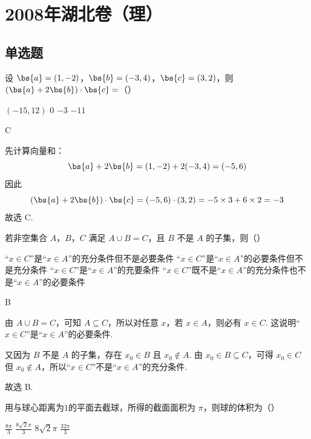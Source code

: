 \chapter{2008年湖北卷（理）}

\section{单选题}

\begin{problem}
设 \(\bs{a}=(1,-2)\)，\(\bs{b}=(-3,4)\)，\(\bs{c}=(3,2)\)，则 \((\bs{a}+2\bs{b})\cdot \bs{c}=\)（\quad）

\choices
    {\((-15,12)\)}
    {\(0\)}
    {\(-3\)}
    {\(-11\)}
\end{problem}

\begin{answer}
C
\end{answer}

\begin{solution}
先计算向量和：
\[
\bs{a}+2\bs{b}=(1,-2)+2(-3,4)=(-5,6)
\]
因此
\[
(\bs{a}+2\bs{b})\cdot\bs{c}=(-5,6)\cdot(3,2)=-5\times3+6\times2=-3
\]
故选 C.
\end{solution}

\begin{problem}
若非空集合 \(A\)，\(B\)，\(C\) 满足 \(A \cup B = C\)，且 \(B\) 不是 \(A\) 的子集，则（\quad）

\choices
    {“\(x \in C\)”是“\(x \in A\)”的充分条件但不是必要条件}
    {“\(x \in C\)”是“\(x \in A\)”的必要条件但不是充分条件}
    {“\(x \in C\)”是“\(x \in A\)”的充要条件}
    {“\(x \in C\)”既不是“\(x \in A\)”的充分条件也不是“\(x \in A\)”的必要条件}
\end{problem}

\begin{answer}
B
\end{answer}

\begin{solution}
由 \(A\cup B=C\)，可知 \(A\subseteq C\)，所以对任意 \(x\)，若 \(x\in A\)，则必有 \(x\in C\). 这说明“\(x\in C\)”是“\(x\in A\)”的必要条件.

又因为 \(B\) 不是 \(A\) 的子集，存在 \(x_0\in B\) 且 \(x_0\notin A\). 由 \(x_0\in B\subseteq C\)，可得 \(x_0\in C\) 但 \(x_0\notin A\)，所以“\(x\in C\)”不是“\(x\in A\)”的充分条件.

故选 B.
\end{solution}

\begin{problem}
用与球心距离为\(1\)的平面去截球，所得的截面面积为 \(\pi\)，则球的体积为（\quad）

\choices
    {\(\frac{8\pi}{3}\)}
    {\(\frac{8\sqrt{2}\pi}{3}\)}
    {\(8\sqrt{2}\pi\)}
    {\(\frac{32\pi}{3}\)}
\end{problem}

